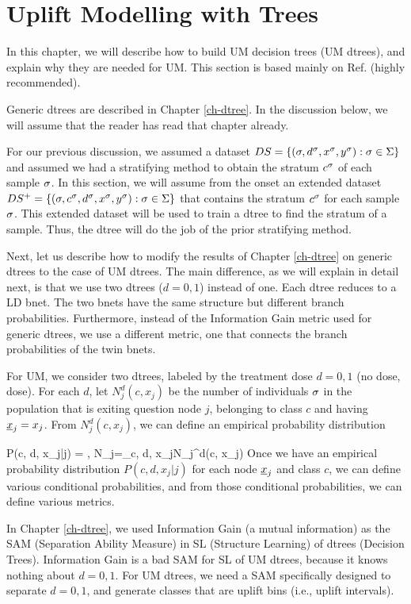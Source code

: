 \documentclass[12pt]{report}
\begin{document}
\chapter{Uplift Modelling with Trees}
\label{ch-uplift-tree}


In this chapter,
we will describe
how to build UM decision trees (UM dtrees),
and explain why they are needed
for UM. This section is based
mainly on Ref.\cite{jaros} (highly recommended).

Generic dtrees are
described in Chapter \ref{ch-dtree}.
In the discussion below, we will assume that the reader has read
that chapter already.

For our previous discussion,
we assumed a dataset
$DS= \{ (\sigma, d^\sigma, x^\sigma, y^\sigma):
 \sigma\in\Sigma\}$ and
 assumed we had a stratifying
 method to obtain the stratum
 $c^\sigma$ of each sample $\sigma$.
In this section, we will assume
from the onset an
extended dataset
$DS^+= \{ (\sigma, c^\sigma, d^\sigma, x^\sigma, y^\sigma):
 \sigma\in\Sigma\}$
that contains the stratum $c^\sigma$ for each sample $\sigma$.
This extended dataset will be used
to train a dtree to find the stratum of
a sample. Thus, the dtree will
do the job of the prior stratifying method.

Next,
let us describe how to
modify the results
of Chapter \ref{ch-dtree}
on generic dtrees
to the case of UM dtrees.
The main difference,
as we will
explain in detail
next,
is that we use two dtrees ($d=0,1$) instead
of one. Each dtree reduces to a LD bnet. The two
bnets have the same structure but
different branch probabilities.
Furthermore, instead of the Information
Gain metric
used for generic dtrees,
we use a different
metric, one
that connects the branch probabilities
of the twin bnets.

For UM, we consider two dtrees,
labeled by the treatment dose $d=0,1$ (no dose, dose).
For each $d$, let $N_j^d(c, x_j)$ be the number
of individuals $\sigma$
in the population that is exiting question node $j$,
belonging to class $c$ and having $\rvx_j=x_j$.
From $N_j^d(c, x_j)$, we can define
an empirical
probability distribution

\beq
P(c, d, x_j|j)
=
\;,\;\; 
N_j=\sum_{c, d, x_j}N_j^d(c, x_j)
\eeq
Once
we have an empirical probability distribution
$P(c, d, x_j| j)$ for each node $\rvx_j$ and
class $c$,
we can define various conditional
probabilities, and from those
conditional probabilities,
we can define various metrics.



In Chapter
\ref{ch-dtree},
we used Information
Gain
(a mutual information)
as the SAM (Separation Ability Measure)
in
SL (Structure Learning)
of dtrees (Decision Trees).
Information Gain
is a bad
SAM for SL of UM dtrees,
because it knows nothing about
 $d=0,1$.
For
UM dtrees,
we need a SAM specifically
designed to separate $d=0,1$, and generate
classes that are
 uplift bins (i.e., uplift intervals).
\end{document}
